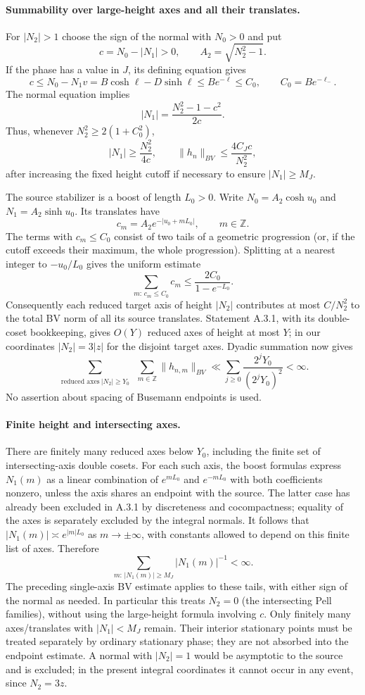 \paragraph{Summability over large-height axes and all their translates.}
For $|N_2|>1$ choose the sign of the normal with $N_0>0$ and put
\[
 c=N_0-|N_1|>0,\qquad A_2=\sqrt{N_2^2-1}.
\]
If the phase has a value in $J$, its defining equation gives
\[
 c\leq N_0-N_1v
       =B\cosh\ell-D\sinh\ell
       \leq B e^{-\ell}\leq C_0,
 \qquad C_0=B e^{-\ell_-}.
\]
The normal equation implies
\[
 |N_1|=\frac{N_2^2-1-c^2}{2c}.
\]
Thus, whenever $N_2^2\geq2(1+C_0^2)$,
\[
 |N_1|\geq\frac{N_2^2}{4c},\qquad
 \|h_n\|_{BV}\leq\frac{4C_Jc}{N_2^2},
\]
after increasing the fixed height cutoff if necessary to ensure
$|N_1|\geq M_J$.

The source stabilizer is a boost of length $L_0>0$.
Write $N_0=A_2\cosh u_0$ and $N_1=A_2\sinh u_0$.
Its translates have
\[
 c_m=A_2e^{-|u_0+mL_0|},\qquad m\in\mathbb Z.
\]
The terms with $c_m\leq C_0$ consist of two tails of a geometric
progression (or, if the cutoff exceeds their maximum, the whole
progression).  Splitting at a nearest integer to $-u_0/L_0$ gives
the uniform estimate
\[
 \sum_{m:\,c_m\leq C_0}c_m
 \leq \frac{2C_0}{1-e^{-L_0}}.
\]
Consequently each reduced target axis of height $|N_2|$ contributes
at most $C/N_2^2$ to the total BV norm of all its source translates.
Statement A.3.1, with its double-coset bookkeeping, gives
$O(Y)$ reduced axes of height at most $Y$; in our coordinates
$|N_2|=3|z|$ for the disjoint target axes.  Dyadic summation now gives
\[
 \sum_{\substack{\text{reduced axes}\ |N_2|\geq Y_0}}
 \ \sum_{m\in\mathbb Z}\|h_{n,m}\|_{BV}
 \ll\sum_{j\geq0}\frac{2^jY_0}{(2^jY_0)^2}<\infty.
\]
No assertion about spacing of Busemann endpoints is used.

\paragraph{Finite height and intersecting axes.}
There are finitely many reduced axes below $Y_0$, including the
finite set of intersecting-axis double cosets.  For each such axis,
the boost formulas express $N_1(m)$ as a linear combination of
$e^{mL_0}$ and $e^{-mL_0}$ with both coefficients nonzero, unless
the axis shares an endpoint with the source.  The latter case has
already been excluded in A.3.1 by discreteness and cocompactness;
equality of the axes is separately excluded by the integral normals.
It follows that $|N_1(m)|\asymp e^{|m|L_0}$ as $m\to\pm\infty$,
with constants allowed to depend on this finite list of axes.
Therefore
\[
 \sum_{m:\,|N_1(m)|\geq M_J}|N_1(m)|^{-1}<\infty.
\]
The preceding single-axis BV estimate applies to these tails,
with either sign of the normal as needed.  In particular this
treats $N_2=0$ (the intersecting Pell families), without using
the large-height formula involving $c$.
Only finitely many axes/translates with $|N_1|<M_J$ remain.
Their interior stationary points must be treated separately by
ordinary stationary phase; they are not absorbed into the endpoint
estimate.  A normal with $|N_2|=1$ would be asymptotic to the source
and is excluded; in the present integral coordinates it cannot
occur in any event, since $N_2=3z$.

